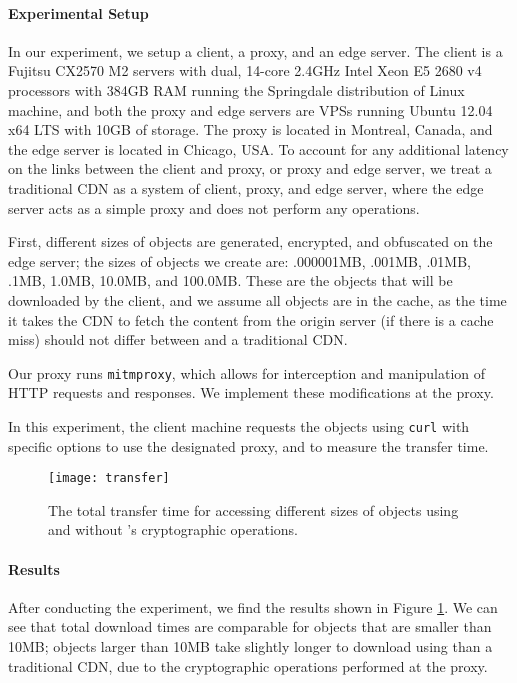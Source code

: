 \paragraph{Experimental Setup}
In our experiment, we setup a client, a proxy, and an edge server.  The client is a  Fujitsu CX2570 M2 servers with dual, 
14-core 2.4GHz Intel Xeon E5 2680 v4 processors with 384GB RAM running the Springdale distribution of Linux machine, 
and both the proxy and edge servers are VPSs running Ubuntu 12.04 x64 LTS with 10GB of storage. The proxy is located in 
Montreal, Canada, and the edge server is located in Chicago, USA.  To account for any additional latency on the links between 
the client and proxy, or proxy and edge server, we treat a traditional CDN as a system of client, proxy, and edge server, where 
the edge server acts as a simple proxy and does not perform any operations.  

First, different sizes of objects are generated, encrypted, and obfuscated on the edge server; the sizes of objects we create are: 
.000001MB, .001MB, .01MB, .1MB, 1.0MB, 10.0MB, and 100.0MB.  These are the objects that will be downloaded by the client, and we 
assume all objects are in the cache, as the time it takes the CDN to fetch the content from the origin server (if there is a cache 
miss) should not differ between \system{} and a traditional CDN. 

Our proxy runs {\tt mitmproxy}, which allows for interception and manipulation of HTTP requests and responses.  We implement 
these modifications at the proxy.  

In this experiment, the client machine requests the objects using {\tt curl} with specific options to use the designated proxy, 
and to measure the transfer time.  \\

\begin{figure}[t]
\centering
\texttt{[image: transfer]}
\caption{The total transfer time for accessing different sizes of objects using \system{} and without \system{}'s cryptographic operations.}
\label{fig:transfer}
\end{figure}

\paragraph{Results}
After conducting the experiment, we find the results shown in Figure \ref{fig:transfer}.  We can see that total download times are comparable 
for objects that are smaller than 10MB; objects larger than 10MB take slightly longer to download using \system{} than a traditional CDN, 
due to the cryptographic operations performed at the proxy.  

